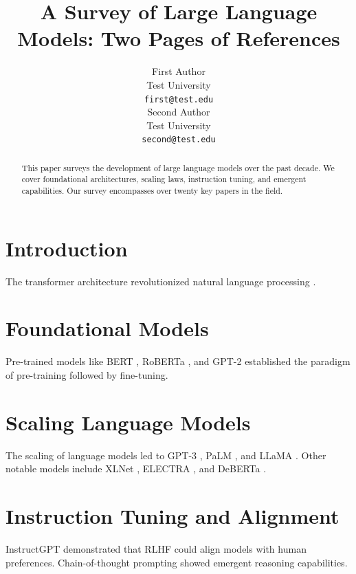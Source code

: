 \documentclass[11pt]{article}
\title{A Survey of Large Language Models: Two Pages of References}
\author{First Author \\
  Test University \\
  \texttt{first@test.edu} \\\And
  Second Author \\
  Test University \\
  \texttt{second@test.edu} \\}
\begin{document}
\maketitle

\begin{abstract}
This paper surveys the development of large language models over the past decade. We cover foundational architectures, scaling laws, instruction tuning, and emergent capabilities. Our survey encompasses over twenty key papers in the field.
\end{abstract}

\section{Introduction}
\lipsum[1-3]
The transformer architecture \cite{vaswani-etal-2017-attention} revolutionized natural language processing \cite{devlin-etal-2019-bert,brown-etal-2020-language,liu2019roberta}.

\lipsum[4-5]

\section{Foundational Models}
\lipsum[6-8]
Pre-trained models like BERT \cite{devlin-etal-2019-bert}, RoBERTa \cite{liu2019roberta}, and GPT-2 \cite{radford-etal-2019-language} established the paradigm of pre-training followed by fine-tuning.

\lipsum[9-11]

\section{Scaling Language Models}
\lipsum[12-14]
The scaling of language models led to GPT-3 \cite{brown-etal-2020-language}, PaLM \cite{chowdhery-etal-2022-palm}, and LLaMA \cite{touvron-etal-2023-llama}. Other notable models include XLNet \cite{yang-etal-2019-xlnet}, ELECTRA \cite{clark-etal-2020-electra}, and DeBERTa \cite{he-etal-2021-deberta}.

\lipsum[15-17]

\section{Instruction Tuning and Alignment}
\lipsum[18-20]
InstructGPT \cite{ouyang-etal-2022-training} demonstrated that RLHF could align models with human preferences. Chain-of-thought prompting \cite{wei-etal-2022-chain} showed emergent reasoning capabilities.
\end{document}
